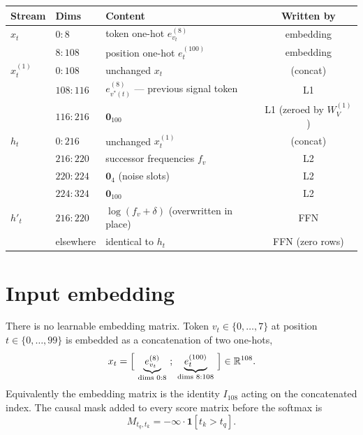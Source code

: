 \documentclass[11pt]{article}
\newcommand{\R}{\mathbb{R}}
\newcommand{\Wv}{W_V}
\begin{document}
\begin{center}
\begin{tabular}{@{}lllc@{}}
\toprule
\textbf{Stream} & \textbf{Dims} & \textbf{Content} & \textbf{Written by}\\
\midrule
$x_t$ & $0{:}8$ & token one-hot $e^{(8)}_{v_t}$ & embedding\\
      & $8{:}108$ & position one-hot $e^{(100)}_t$ & embedding\\
\midrule
$x^{(1)}_t$ & $0{:}108$ & unchanged $x_t$ & (concat)\\
            & $108{:}116$ & $e^{(8)}_{v^*(t)}$ --- previous signal token & L1\\
            & $116{:}216$ & $\bm{0}_{100}$ & L1 (zeroed by $\Wv^{(1)}$)\\
\midrule
$h_t$ & $0{:}216$ & unchanged $x^{(1)}_t$ & (concat)\\
      & $216{:}220$ & successor frequencies $f_v$ & L2\\
      & $220{:}224$ & $\bm{0}_4$ (noise slots) & L2\\
      & $224{:}324$ & $\bm{0}_{100}$ & L2\\
\midrule
$h'_t$ & $216{:}220$ & $\log(f_v+\delta)$ (overwritten in place) & FFN\\
       & elsewhere & identical to $h_t$ & FFN (zero rows)\\
\bottomrule
\end{tabular}
\end{center}

\section{Input embedding}

There is no learnable embedding matrix. Token $v_t\in\{0,\dots,7\}$ at position
$t\in\{0,\dots,99\}$ is embedded as a concatenation of two one-hots,
\begin{equation}
x_t=\Bigl[\ \underbrace{e^{(8)}_{v_t}}_{\text{dims }0:8}\ ;\
\underbrace{e^{(100)}_{t}}_{\text{dims }8:108}\ \Bigr]\in\R^{108}.
\end{equation}
Equivalently the embedding matrix is the identity $I_{108}$ acting on the concatenated index.
The causal mask added to every score matrix before the softmax is
\begin{equation}
M_{t_q,t_k}=-\infty\cdot\bm{1}[t_k>t_q].
\end{equation}

\end{document}

